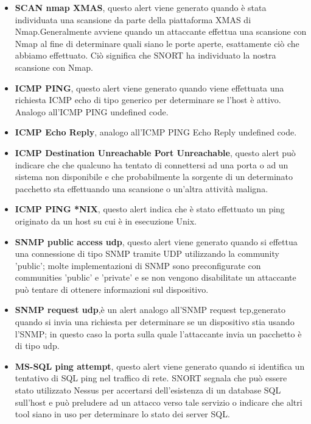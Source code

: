 \begin{itemize}
    \item \textbf{SCAN nmap XMAS}, questo alert viene generato quando è stata individuata una scansione da parte della piattaforma XMAS di Nmap.Generalmente avviene quando un attaccante effettua una scansione con Nmap al fine di determinare quali siano le porte aperte, esattamente ciò che abbiamo effettuato. Ciò significa che SNORT ha individuato la nostra scansione con Nmap.

    \item \textbf{ICMP PING}, questo alert viene generato quando viene effettuata una richiesta ICMP echo di tipo generico per determinare se l'host è attivo. Analogo all'ICMP PING undefined code.
        
    \item \textbf{ICMP Echo Reply}, analogo all'ICMP PING Echo Reply undefined code.
    
    \item \textbf{ICMP Destination Unreachable Port Unreachable}, questo alert può indicare che che qualcuno ha tentato di connettersi ad una porta o ad un sistema non disponibile e che probabilmente la sorgente di un determinato pacchetto sta effettuando una scansione o un'altra attività maligna.
        
    \item \textbf{ICMP PING *NIX}, questo alert indica che è stato effettuato un ping originato da un host su cui è in esecuzione Unix.
        
    \item \textbf{SNMP public access udp}, questo alert viene generato quando si effettua una connessione di tipo SNMP tramite UDP utilizzando la community 'public'; molte implementazioni di SNMP sono preconfigurate con communities 'public' e 'private' e se non vengono disabilitate un attaccante può tentare di ottenere informazioni sul dispositivo.
        
    \item \textbf{SNMP request udp},è un alert analogo all'SNMP request tcp,generato quando si invia una richiesta per determinare se un dispositivo stia usando l'SNMP; in questo caso la porta sulla quale l'attaccante invia un pacchetto è di tipo udp.
        
    \item \textbf{MS-SQL ping attempt}, questo alert viene generato quando si identifica un tentativo di SQL ping nel traffico di rete. SNORT segnala che può essere stato utilizzato Nessus per accertarsi dell'esistenza di un database SQL sull'host e può preludere ad un attacco verso tale servizio o indicare che altri tool siano in uso per determinare lo stato dei server SQL.
        

\end{itemize}
